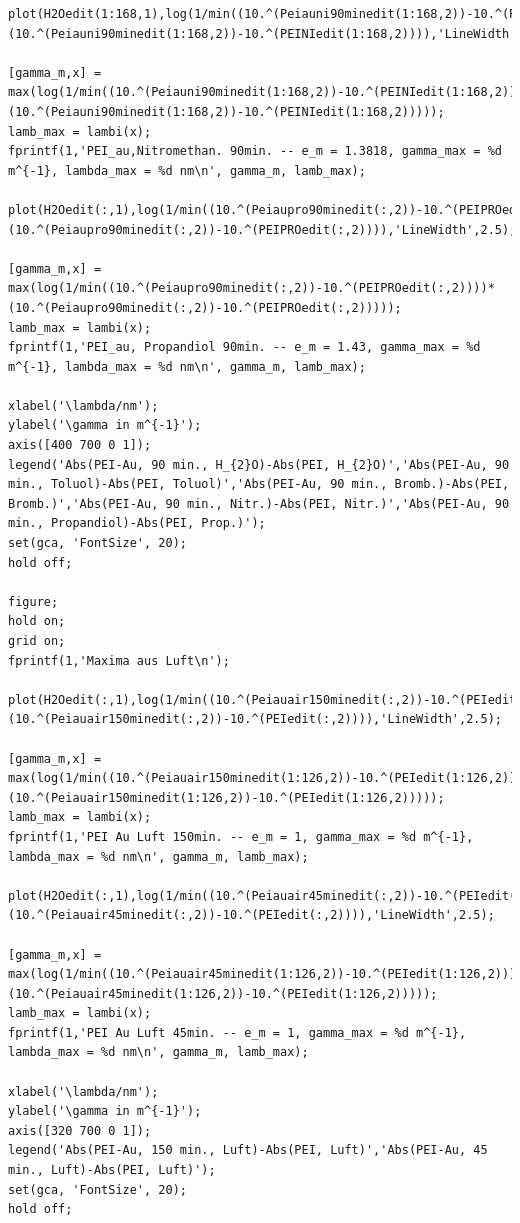 \documentclass[numbers=noenddot,a4paper,notitlepage,twoside,BCOR15mm]{scrartcl}
\begin{document}
\begin{lstlisting}
plot(H2Oedit(1:168,1),log(1/min((10.^(Peiauni90minedit(1:168,2))-10.^(PEINIedit(1:168,2))))*(10.^(Peiauni90minedit(1:168,2))-10.^(PEINIedit(1:168,2)))),'LineWidth',2.5);

[gamma_m,x] = max(log(1/min((10.^(Peiauni90minedit(1:168,2))-10.^(PEINIedit(1:168,2))))*(10.^(Peiauni90minedit(1:168,2))-10.^(PEINIedit(1:168,2)))));
lamb_max = lambi(x);
fprintf(1,'PEI_au,Nitromethan. 90min. -- e_m = 1.3818, gamma_max = %d m^{-1}, lambda_max = %d nm\n', gamma_m, lamb_max);

plot(H2Oedit(:,1),log(1/min((10.^(Peiaupro90minedit(:,2))-10.^(PEIPROedit(:,2))))*(10.^(Peiaupro90minedit(:,2))-10.^(PEIPROedit(:,2)))),'LineWidth',2.5);

[gamma_m,x] = max(log(1/min((10.^(Peiaupro90minedit(:,2))-10.^(PEIPROedit(:,2))))*(10.^(Peiaupro90minedit(:,2))-10.^(PEIPROedit(:,2)))));
lamb_max = lambi(x);
fprintf(1,'PEI_au, Propandiol 90min. -- e_m = 1.43, gamma_max = %d m^{-1}, lambda_max = %d nm\n', gamma_m, lamb_max);

xlabel('\lambda/nm');
ylabel('\gamma in m^{-1}');
axis([400 700 0 1]);
legend('Abs(PEI-Au, 90 min., H_{2}O)-Abs(PEI, H_{2}O)','Abs(PEI-Au, 90 min., Toluol)-Abs(PEI, Toluol)','Abs(PEI-Au, 90 min., Bromb.)-Abs(PEI, Bromb.)','Abs(PEI-Au, 90 min., Nitr.)-Abs(PEI, Nitr.)','Abs(PEI-Au, 90 min., Propandiol)-Abs(PEI, Prop.)');
set(gca, 'FontSize', 20);
hold off;

figure;
hold on;
grid on;
fprintf(1,'Maxima aus Luft\n');

plot(H2Oedit(:,1),log(1/min((10.^(Peiauair150minedit(:,2))-10.^(PEIedit(:,2))))*(10.^(Peiauair150minedit(:,2))-10.^(PEIedit(:,2)))),'LineWidth',2.5);

[gamma_m,x] = max(log(1/min((10.^(Peiauair150minedit(1:126,2))-10.^(PEIedit(1:126,2))))*(10.^(Peiauair150minedit(1:126,2))-10.^(PEIedit(1:126,2)))));
lamb_max = lambi(x);
fprintf(1,'PEI Au Luft 150min. -- e_m = 1, gamma_max = %d m^{-1}, lambda_max = %d nm\n', gamma_m, lamb_max);

plot(H2Oedit(:,1),log(1/min((10.^(Peiauair45minedit(:,2))-10.^(PEIedit(:,2))))*(10.^(Peiauair45minedit(:,2))-10.^(PEIedit(:,2)))),'LineWidth',2.5);

[gamma_m,x] = max(log(1/min((10.^(Peiauair45minedit(1:126,2))-10.^(PEIedit(1:126,2))))*(10.^(Peiauair45minedit(1:126,2))-10.^(PEIedit(1:126,2)))));
lamb_max = lambi(x);
fprintf(1,'PEI Au Luft 45min. -- e_m = 1, gamma_max = %d m^{-1}, lambda_max = %d nm\n', gamma_m, lamb_max);

xlabel('\lambda/nm');
ylabel('\gamma in m^{-1}');
axis([320 700 0 1]);
legend('Abs(PEI-Au, 150 min., Luft)-Abs(PEI, Luft)','Abs(PEI-Au, 45 min., Luft)-Abs(PEI, Luft)');
set(gca, 'FontSize', 20);
hold off;


\end{lstlisting}
\end{document}
